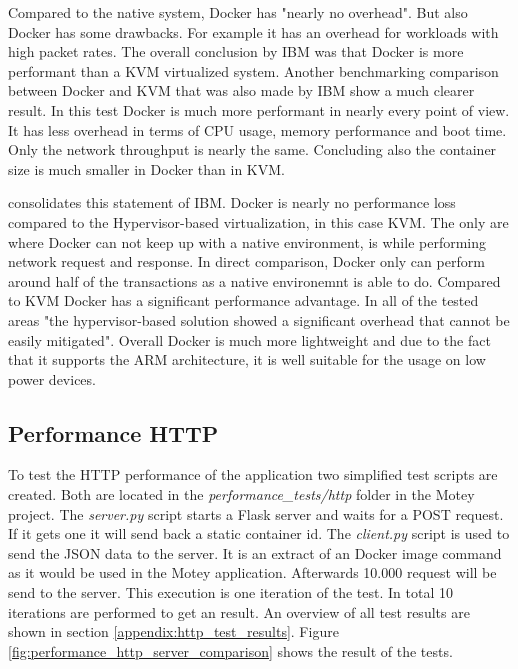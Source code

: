 Compared to the native system, Docker has "nearly no overhead"\autocite[p. 6]{IBM:Performance:2014}.
But also Docker has some drawbacks.
For example it has an overhead for workloads with high packet rates.\autocite[cf.][p. 6]{IBM:Performance:2014}
The overall conclusion by IBM was that Docker is more performant than a \ac{KVM} virtualized system.
\newpage
Another benchmarking comparison\autocite{Russell:Performance:2014} between Docker and \ac{KVM} that was also made by IBM show a much clearer result.
In this test Docker is much more performant in nearly every point of view.
It has less overhead in terms of \ac{CPU} usage\autocite[cf.][p. 25]{Russell:Performance:2014}, memory performance\autocite[cf.][p. 50]{Russell:Performance:2014} and boot time\autocite[cf.][p. 24]{Russell:Performance:2014}.
Only the network throughput is nearly the same.\autocite[cf.][p. 52]{Russell:Performance:2014}
Concluding also the container size is much smaller in Docker than in \ac{KVM}.\autocite[cf.][p. 66]{Russell:Performance:2014}\newline

\autocite{Ramalho:2016} consolidates this statement of IBM.
Docker is nearly no performance loss compared to the Hypervisor-based virtualization, in this case \ac{KVM}.\autocite[cf.][p. 3 ff.]{Ramalho:2016}
The only are where Docker can not keep up with a native environment, is while performing network request and response.
In direct comparison, Docker only can perform around half of the transactions as a native environemnt is able to do.\autocite[cf.][p. 6]{Ramalho:2016}
Compared to \ac{KVM} Docker has a significant performance advantage.
In all of the tested areas "the hypervisor-based solution showed a significant overhead that cannot be easily mitigated"\autocite[p. 6]{Ramalho:2016}.
Overall Docker is much more lightweight and due to the fact that it supports the ARM architecture, it is well suitable for the usage on low power devices.

\subsection{Performance HTTP}
To test the \ac{HTTP} performance of the application two simplified test scripts are created.
Both are located in the \textit{performance\_tests/http} folder in the Motey project.
The \textit{server.py} script starts a Flask server and waits for a POST request.
If it gets one it will send back a static container id.
The \textit{client.py} script is used to send the \ac{JSON} data to the server.
It is an extract of an Docker image command as it would be used in the Motey application.
Afterwards 10.000 request will be send to the server.
This execution is one iteration of the test.
In total 10 iterations are performed to get an result.
An overview of all test results are shown in section \ref{appendix:http_test_results}.
Figure \ref{fig:performance_http_server_comparison} shows the result of the tests.

